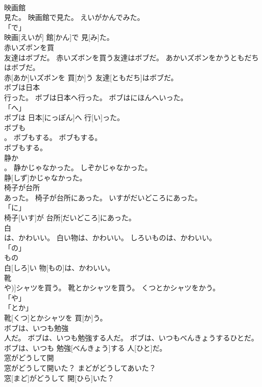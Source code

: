 \documentclass[8pt]{extreport}
\begin{document}
\begin{CJK}{UTF8}{min}
\\	映画館
\\	見た。	映画館で見た。	えいがかんでみた。	
\\	「で」 
\\	映画[えいが] 館[かん]で 見[み]た。		
\\	赤いズボンを買
\\	友達はボブだ。	赤いズボンを買う友達はボブだ。	あかいズボンをかうともだちはボブだ。	
\\	赤[あか]いズボンを 買[か]う 友達[ともだち]はボブだ。		
\\	ボブは日本
\\	行った。	ボブは日本へ行った。	ボブはにほんへいった。	
\\	「へ」 
\\	ボブは 日本[にっぽん]へ 行[い]った。		
\\	ボブも
\\	。	ボブもする。	ボブもする。	
\\	ボブもする。		
\\	静か
\\	。	静かじゃなかった。	しぞかじゃなかった。	
\\	静[しず]かじゃなかった。		
\\	椅子が台所
\\	あった。	椅子が台所にあった。	いすがだいどころにあった。	
\\	「に」 
\\	椅子[いす]が 台所[だいどころ]にあった。		
\\	白
\\	は、かわいい。	白い物は、かわいい。	しろいものは、かわいい。	
\\	「の」 
\\	もの　
\\	白[しろ]い 物[もの]は、かわいい。		
\\	靴
\\	や)]シャツを買う。	靴とかシャツを買う。	くつとかシャツをかう。	
\\	「や」 
\\	「とか」 
\\	靴[くつ]とかシャツを 買[か]う。		
\\	ボブは、いつも勉強
\\	人だ。	ボブは、いつも勉強する人だ。	ボブは、いつもべんきょうするひとだ。	
\\	ボブは、いつも 勉強[べんきょう]する 人[ひと]だ。		
\\	窓がどうして開
\\	窓がどうして開いた？	まどがどうしてあいた？	
\\	窓[まど]がどうして 開[ひら]いた？		

\end{CJK}
\end{document}
